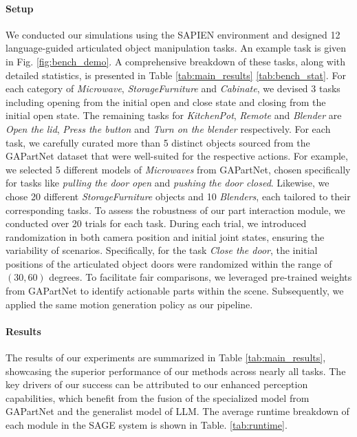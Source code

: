 \paragraph{Setup}
We conducted our simulations using the SAPIEN environment \citep{xiang2020sapien} and designed 12 language-guided articulated object manipulation tasks. An example task is given in Fig. \ref{fig:bench_demo}. A comprehensive breakdown of these tasks, along with detailed statistics, is presented in Table \ref{tab:main_results} \ref{tab:bench_stat}.
For each category of \textit{Microwave}, \textit{StorageFurniture} and \textit{Cabinate}, we devised 3 tasks including opening from the initial open and close state and closing from the initial open state. The remaining tasks for \textit{KitchenPot}, \textit{Remote} and \textit{Blender} are \textit{Open the lid},  \textit{Press the button} and \textit{Turn on the blender} respectively.
For each task, we carefully curated more than 5 distinct objects sourced from the GAPartNet dataset \citep{geng2022gapartnet} that were well-suited for the respective actions. For example, we selected 5 different models of \textit{Microwaves} from GAPartNet, chosen specifically for tasks like \textit{pulling the door open} and \textit{pushing the door closed}. Likewise, we chose 20 different \textit{StorageFurniture} objects and 10 \textit{Blenders}, each tailored to their corresponding tasks.
To assess the robustness of our part interaction module, we conducted over 20 trials for each task. During each trial, we introduced randomization in both camera position and initial joint states, ensuring the variability of scenarios. Specifically, for the task \textit{Close the door}, the initial positions of the articulated object doors were randomized within the range of $(30, 60)$ degrees.
To facilitate fair comparisons, we leveraged pre-trained weights from GAPartNet to identify actionable parts within the scene. Subsequently, we applied the same motion generation policy as our pipeline.


\paragraph{Results}
The results of our experiments are summarized in Table \ref{tab:main_results}, showcasing the superior performance of our methods across nearly all tasks.
The key drivers of our success can be attributed to our enhanced perception capabilities, which benefit from the fusion of the specialized model from GAPartNet and the generalist model of LLM. The average runtime breakdown of each module in the SAGE system is shown in Table. \ref{tab:runtime}.



